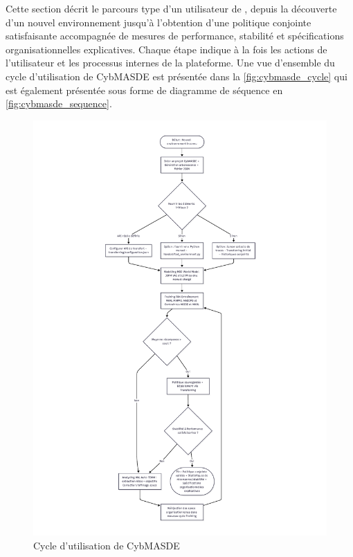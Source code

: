 Cette section décrit le parcours type d'un utilisateur de , depuis la découverte d'un nouvel environnement jusqu'à l'obtention d'une politique conjointe satisfaisante accompagnée de mesures de performance, stabilité et spécifications organisationnelles explicatives. Chaque étape indique à la fois les actions de l'utilisateur et les processus internes de la plateforme. Une vue d'ensemble du cycle d'utilisation de CybMASDE est présentée dans la \autoref{fig:cybmasde_cycle} qui est également présentée sous forme de diagramme de séquence en \autoref{fig:cybmasde_sequence}.

\begin{figure}
  \centering
  \includegraphics[trim={5cm 1cm 5cm 1cm},clip,height=\textheight]{figures/CybMASDE_user_flowchart.pdf}
  \caption{Cycle d'utilisation de CybMASDE}
  \label{fig:cybmasde_cycle}
\end{figure}

